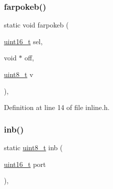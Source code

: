\subsubsection{\texorpdfstring{farpokeb()}{farpokeb()}}
{\footnotesize\ttfamily static void farpokeb (\begin{DoxyParamCaption}\item[{\hyperlink{a00092_a273cf69d639a59973b6019625df33e30_a273cf69d639a59973b6019625df33e30}{uint16\+\_\+t}}]{sel,  }\item[{void $\ast$}]{off,  }\item[{\hyperlink{a00092_aba7bc1797add20fe3efdf37ced1182c5_aba7bc1797add20fe3efdf37ced1182c5}{uint8\+\_\+t}}]{v }\end{DoxyParamCaption})\hspace{0.3cm}{\ttfamily [inline]}, {\ttfamily [static]}}



Definition at line 14 of file inline.\+h.


\mbox{\label{a00104_a0223c8898dfec29069879dc51076e28a_a0223c8898dfec29069879dc51076e28a}} 
\subsubsection{\texorpdfstring{inb()}{inb()}}
{\footnotesize\ttfamily static \hyperlink{a00092_aba7bc1797add20fe3efdf37ced1182c5_aba7bc1797add20fe3efdf37ced1182c5}{uint8\+\_\+t} inb (\begin{DoxyParamCaption}\item[{\hyperlink{a00092_a273cf69d639a59973b6019625df33e30_a273cf69d639a59973b6019625df33e30}{uint16\+\_\+t}}]{port }\end{DoxyParamCaption})\hspace{0.3cm}{\ttfamily [inline]}, {\ttfamily [static]}}



